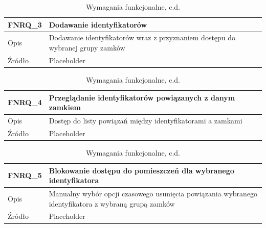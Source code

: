         \begin{table}[h!]
            \ContinuedFloat
            \caption{Wymagania funkcjonalne, c.d.}
            \begin{subtable}[c]{\textwidth}
                \centering
                 \begin{tabular}{|p{2cm}|p{12cm}|}
                    \hline FNRQ\_3      & \textbf{Dodawanie identyfikatorów}  \\
                    \hline \cellcolor[gray]{0.8} Opis         & Dodawanie identyfikatorów wraz z przyznaniem dostępu do wybranej grupy zamków \\
                    \hline \cellcolor[gray]{0.8} Źródło       & Placeholder    \\
                    \hline
                \end{tabular}
                \label{tbl:fnrq3}
                \vspace{10mm}           
            \end{subtable}
        \quad%
            \begin{subtable}[c]{\textwidth}
                \centering
                 \begin{tabular}{|p{2cm}|p{12cm}|}
                    \hline FNRQ\_4      & \textbf{Przeglądanie identyfikatorów powiązanych z danym zamkiem} \\
                    \hline \cellcolor[gray]{0.8} Opis         & Dostęp do listy powiązań między identyfikatorami a zamkami \\
                    \hline \cellcolor[gray]{0.8} Źródło       & Placeholder    \\
                    \hline
                \end{tabular}
                \label{tbl:fnrq4}
                \vspace{10mm}           
            \end{subtable}
        \quad%
            \begin{subtable}[c]{\textwidth}
                \centering
                 \begin{tabular}{|p{2cm}|p{12cm}|}
                    \hline FNRQ\_5      & \textbf{Blokowanie dostępu do pomieszczeń dla wybranego identyfikatora}  \\
                    \hline \cellcolor[gray]{0.8} Opis         & Manualny wybór opcji czasowego usunięcia powiązania wybranego identyfikatora z wybraną grupą zamków \\
                    \hline \cellcolor[gray]{0.8} Źródło       & Placeholder    \\

\end{tabular}
\end{subtable}
\end{table}
